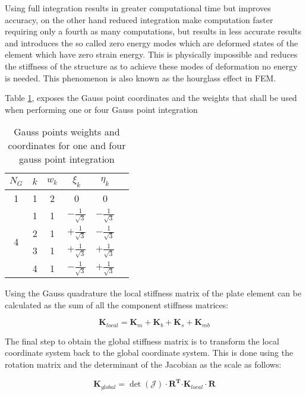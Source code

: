 Using full integration results in greater computational time but
improves accuracy, on the other hand reduced integration make
computation faster requiring only a fourth as many computations, but
results in less accurate results and introduces the so called zero
energy modes which are deformed states of the element which have zero
strain energy. This is physically impossible and reduces the stiffness
of the structure as to achieve these modes of deformation no energy is
needed. This phenomenon is also known as the hourglass effect in FEM.

Table \ref{tab:GaussPoints}, exposes the Gauss point coordinates and the
weights that shall be used when performing one or four Gauss point
integration
\setlength{\tabcolsep}{20pt} %
\renewcommand{\arraystretch}{1.3}
\begin{table}[h]
    \centering
    \begin{tabular}{c | c c c c c}
        $N_G$ & $k$ & $w_k$ & $\xi_k$ & $\eta_k$ \\ \hline
        1 & 1 & 2 & 0 & 0 \\ \hline
        \multirow{4}{*}{4} & 1 & 1 & $-\frac{1}{\sqrt{3}}$ & $-\frac{1}{\sqrt{3}}$ \\
          & 2 & 1 & $+\frac{1}{\sqrt{3}}$ & $-\frac{1}{\sqrt{3}}$ \\
          & 3 & 1 & $+\frac{1}{\sqrt{3}}$ & $+\frac{1}{\sqrt{3}}$ \\
          & 4 & 1 & $-\frac{1}{\sqrt{3}}$ & $+\frac{1}{\sqrt{3}}$ \\
    \end{tabular}
    \caption{Gauss points weights and coordinates for one and four gauss point integration}
    \label{tab:GaussPoints}
\end{table}

Using the Gauss quadrature the local stiffness matrix of the plate
element can be calculated as the sum of all the component stiffness
matrices:

\begin{equation}
\mathbf{K}_{local} = \mathbf{K}_{m} + \mathbf{K}_{b} + \mathbf{K}_{s} + \mathbf{K}_{mb}
\end{equation}

The final step to obtain the global stiffness matrix is to transform the
local coordinate system back to the global coordinate system. This is
done using the rotation matrix and the determinant of the Jacobian as
the scale as follows:

\begin{equation}
\mathbf{K}_{global} = \det\left( \mathcal{J} \right) \cdot \mathbf{R}^{\mathbf{T}}\mathbf{\cdot}\mathbf{K}_{local} \cdot \mathbf{R}
\end{equation}

